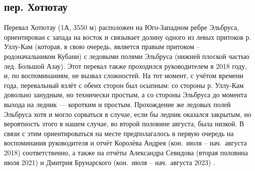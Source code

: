 \subsection{пер. Хотютау} 
Перевал Хотютау (1А, 3550 м) расположен на Юго-Западном ребре Эльбруса, ориентирован с запада на восток и связывает долину одного из левых притоков р. Уллу-Кам (которая, в свою очередь, является правым притоком -- родоначальником Кубани) с ледовыми полями Эльбруса (нижней плоской частью лед. Большой Азау). Этот перевал также проходился руководителем в 2018 году, и, по воспоминаниям, не вызвал сложностей. На тот момент, с учётом времени года, перевальный взлёт с обеих сторон был осыпным: со стороны р. Уллу-Кам довольно занудным, но технически простым, а со стороны Эльбруса до момента выхода на ледник --- коротким и простым. Прохождение же ледовых полей Эльбруса хотя и могло сорваться в случае, если бы ледник оказался закрытым, но вероятность этого в нашем случае, во второй половине августа, была низкой. В связи с этим ориентироваться на месте предполагалось в первую очередь на воспоминания руководителя и отчёт Королёва Андрея (кон.~июля -- нач.~августа 2018) \cite{Korolyov2018} соответственно, а также на отчёты Александра Севидова (вторая половина июля 2021) \cite{Sevidov2021} и Дмитрия Брунарского (кон.~июля -- нач.~августа 2023) \cite{Brunarsky2023}.